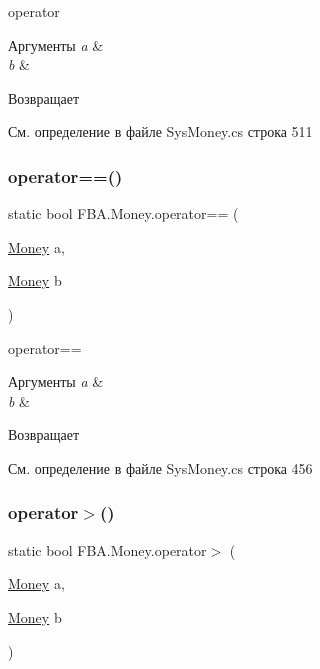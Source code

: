 operator 


\begin{DoxyParams}{Аргументы}
{\em a} & \\
\hline
{\em b} & \\
\hline
\end{DoxyParams}
\begin{DoxyReturn}{Возвращает}

\end{DoxyReturn}


См. определение в файле Sys\+Money.\+cs строка 511

\mbox{\label{struct_f_b_a_1_1_money_ad41523499a6a5cb80be9a0b59921bb80}} 
\subsubsection{\texorpdfstring{operator==()}{operator==()}}
{\footnotesize\ttfamily static bool F\+B\+A.\+Money.\+operator== (\begin{DoxyParamCaption}\item[{\mbox{\hyperlink{struct_f_b_a_1_1_money}{Money}}}]{a,  }\item[{\mbox{\hyperlink{struct_f_b_a_1_1_money}{Money}}}]{b }\end{DoxyParamCaption})\hspace{0.3cm}{\ttfamily [static]}}



operator== 


\begin{DoxyParams}{Аргументы}
{\em a} & \\
\hline
{\em b} & \\
\hline
\end{DoxyParams}
\begin{DoxyReturn}{Возвращает}

\end{DoxyReturn}


См. определение в файле Sys\+Money.\+cs строка 456

\mbox{\label{struct_f_b_a_1_1_money_a33bc38e2ecdadba63b98437c2fb9dce1}} 
\subsubsection{\texorpdfstring{operator$>$()}{operator>()}}
{\footnotesize\ttfamily static bool F\+B\+A.\+Money.\+operator$>$ (\begin{DoxyParamCaption}\item[{\mbox{\hyperlink{struct_f_b_a_1_1_money}{Money}}}]{a,  }\item[{\mbox{\hyperlink{struct_f_b_a_1_1_money}{Money}}}]{b }\end{DoxyParamCaption})\hspace{0.3cm}{\ttfamily [static]}}



